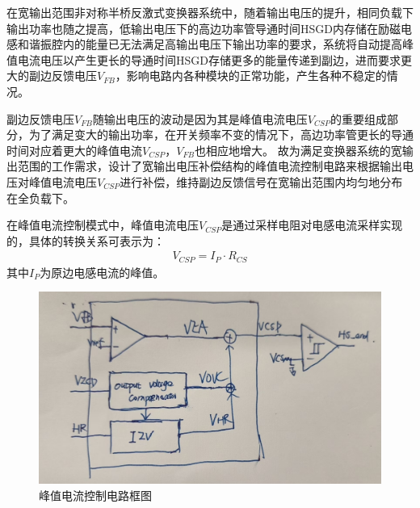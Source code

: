 在宽输出范围非对称半桥反激式变换器系统中，随着输出电压的提升，相同负载下输出功率也随之提高，低输出电压下的高边功率管导通时间HSGD内存储在励磁电感和谐振腔内的能量已无法满足高输出电压下输出功率的要求，系统将自动提高峰值电流电压以产生更长的导通时间HSGD存储更多的能量传递到副边，进而要求更大的副边反馈电压$V_{FB}$，影响电路内各种模块的正常功能，产生各种不稳定的情况。

副边反馈电压$V_{FB}$随输出电压的波动是因为其是峰值电流电压$V_{CSP}$的重要组成部分，为了满足变大的输出功率，在开关频率不变的情况下，高边功率管更长的导通时间对应着更大的峰值电流$V_{CSP}$，$V_{FB}$也相应地增大。
故为满足变换器系统的宽输出范围的工作需求，设计了宽输出电压补偿结构的峰值电流控制电路来根据输出电压对峰值电流电压$V_{CSP}$进行补偿，维持副边反馈信号在宽输出范围内均匀地分布在全负载下。


在峰值电流控制模式中，峰值电流电压$V_{CSP}$是通过采样电阻对电感电流采样实现的，具体的转换关系可表示为：
\begin{align}
    \label{eq:VCSP公式}
    V_{CSP} = I_P \cdot R_{CS} 
\end{align}
其中$I_P$为原边电感电流的峰值。

\begin{figure}[htbp] 
    \centering
    \includegraphics[width=0.8\linewidth]{figures/峰值电流控制.jpg}
    \caption{峰值电流控制电路框图}
    \label{fig:峰值电流控制框图}
\end{figure}

